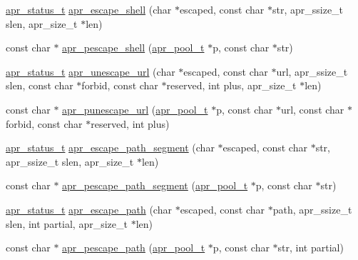 \begin{DoxyCompactItemize}
\item 
\hyperlink{group__apr__errno_gaf76ee4543247e9fb3f3546203e590a6c}{apr\-\_\-status\-\_\-t} \hyperlink{group___a_p_r___util___escaping_gafdfca9adc06570fa6efd802e24dce6d1}{apr\-\_\-escape\-\_\-shell} (char $\ast$escaped, const char $\ast$str, apr\-\_\-ssize\-\_\-t slen, apr\-\_\-size\-\_\-t $\ast$len)
\item 
const char $\ast$ \hyperlink{group___a_p_r___util___escaping_ga81e97334f8033bfbc3acd5e15262323e}{apr\-\_\-pescape\-\_\-shell} (\hyperlink{group__apr__pools_gaf137f28edcf9a086cd6bc36c20d7cdfb}{apr\-\_\-pool\-\_\-t} $\ast$p, const char $\ast$str)
\item 
\hyperlink{group__apr__errno_gaf76ee4543247e9fb3f3546203e590a6c}{apr\-\_\-status\-\_\-t} \hyperlink{group___a_p_r___util___escaping_ga9a6b08630ef5a605def1dfa4a54b026f}{apr\-\_\-unescape\-\_\-url} (char $\ast$escaped, const char $\ast$url, apr\-\_\-ssize\-\_\-t slen, const char $\ast$forbid, const char $\ast$reserved, int plus, apr\-\_\-size\-\_\-t $\ast$len)
\item 
const char $\ast$ \hyperlink{group___a_p_r___util___escaping_gac713d5687a00134cef5c795dbf4e6dbe}{apr\-\_\-punescape\-\_\-url} (\hyperlink{group__apr__pools_gaf137f28edcf9a086cd6bc36c20d7cdfb}{apr\-\_\-pool\-\_\-t} $\ast$p, const char $\ast$url, const char $\ast$forbid, const char $\ast$reserved, int plus)
\item 
\hyperlink{group__apr__errno_gaf76ee4543247e9fb3f3546203e590a6c}{apr\-\_\-status\-\_\-t} \hyperlink{group___a_p_r___util___escaping_ga2fba5a28f4924f00f1ba9a56bc87f651}{apr\-\_\-escape\-\_\-path\-\_\-segment} (char $\ast$escaped, const char $\ast$str, apr\-\_\-ssize\-\_\-t slen, apr\-\_\-size\-\_\-t $\ast$len)
\item 
const char $\ast$ \hyperlink{group___a_p_r___util___escaping_ga36bd45eb1f919fe61f04f5e9087c6242}{apr\-\_\-pescape\-\_\-path\-\_\-segment} (\hyperlink{group__apr__pools_gaf137f28edcf9a086cd6bc36c20d7cdfb}{apr\-\_\-pool\-\_\-t} $\ast$p, const char $\ast$str)
\item 
\hyperlink{group__apr__errno_gaf76ee4543247e9fb3f3546203e590a6c}{apr\-\_\-status\-\_\-t} \hyperlink{group___a_p_r___util___escaping_gae67859a1d260f354c16e939d24d67058}{apr\-\_\-escape\-\_\-path} (char $\ast$escaped, const char $\ast$path, apr\-\_\-ssize\-\_\-t slen, int partial, apr\-\_\-size\-\_\-t $\ast$len)
\item 
const char $\ast$ \hyperlink{group___a_p_r___util___escaping_gacd4fc208448eb07af16350802077783a}{apr\-\_\-pescape\-\_\-path} (\hyperlink{group__apr__pools_gaf137f28edcf9a086cd6bc36c20d7cdfb}{apr\-\_\-pool\-\_\-t} $\ast$p, const char $\ast$str, int partial)

\end{DoxyCompactItemize}
